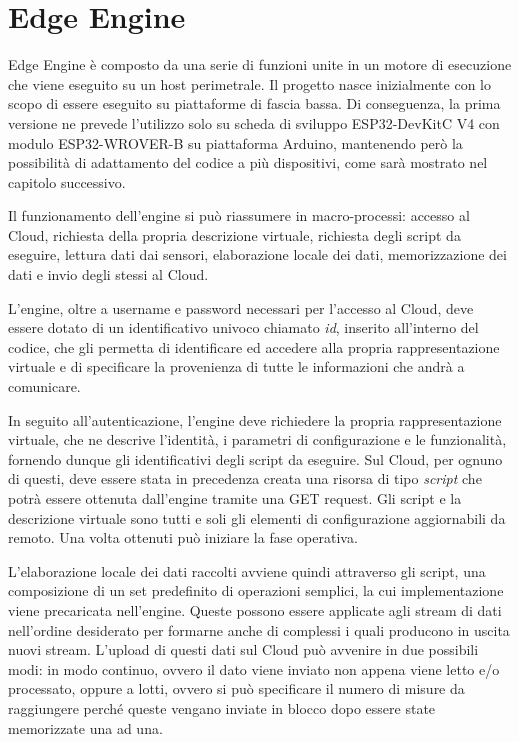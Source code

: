 \section{Edge Engine}
Edge Engine è composto da una serie di funzioni unite in un motore di esecuzione che viene eseguito su un host perimetrale. Il progetto nasce inizialmente con lo scopo di essere eseguito su piattaforme di fascia bassa. Di conseguenza, la prima versione ne prevede l’utilizzo solo su scheda di sviluppo ESP32-DevKitC V4 con modulo ESP32-WROVER-B su piattaforma Arduino, mantenendo però la possibilità di adattamento del codice a più dispositivi, come sarà mostrato nel capitolo successivo.

Il funzionamento dell'engine si può riassumere in macro-processi: accesso al Cloud, richiesta della propria descrizione virtuale, richiesta degli script da eseguire, lettura dati dai sensori, elaborazione locale dei dati, memorizzazione dei dati e invio degli stessi al Cloud.

L’engine, oltre a username e password necessari per l’accesso al Cloud, deve essere dotato di un identificativo univoco chiamato \textit{id}, inserito all'interno del codice, che gli permetta di identificare ed accedere alla propria rappresentazione virtuale e di specificare la provenienza di tutte le informazioni che andrà a comunicare.

In seguito all'autenticazione, l'engine deve richiedere la propria rappresentazione virtuale, che ne descrive l'identità, i parametri di configurazione e le funzionalità, fornendo dunque gli identificativi degli script da eseguire. Sul Cloud, per ognuno di questi, deve essere stata in precedenza creata una risorsa di tipo \textit{script} che potrà essere ottenuta dall’engine tramite una GET request. Gli script e la descrizione virtuale sono tutti e soli gli elementi di configurazione aggiornabili da remoto. Una volta ottenuti può iniziare la fase operativa.

L’elaborazione locale dei dati raccolti avviene quindi attraverso gli script, una composizione di un set predefinito di operazioni semplici, la cui implementazione viene precaricata nell'engine. Queste possono essere applicate agli stream di dati nell'ordine desiderato per formarne anche di complessi i quali producono in uscita nuovi stream. L'upload di questi dati sul Cloud può avvenire in due possibili modi: in modo continuo, ovvero il dato viene inviato non appena viene letto e/o processato, oppure a lotti, ovvero si può specificare il numero di misure da raggiungere perché queste vengano inviate in blocco dopo essere state memorizzate una ad una.

